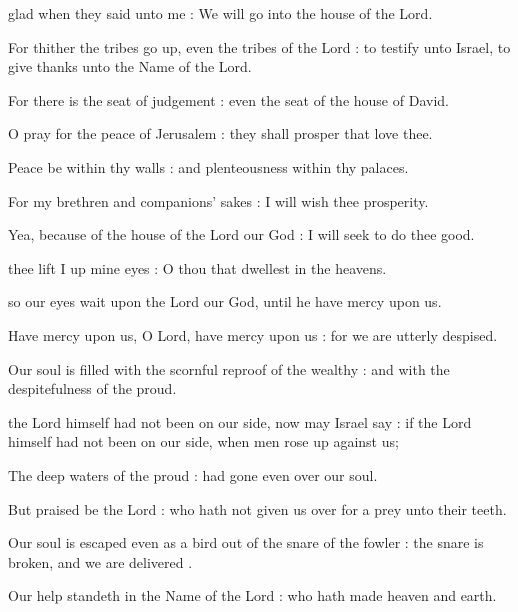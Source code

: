  glad when they said unto me : We will go into the house of the Lord.\par
{}
For thither the tribes go up, even the tribes of the Lord : to testify unto Israel, to give thanks unto the Name of the Lord.\par
{}For there is the seat of judgement : even the seat of the house of David.\par
{}O pray for the peace of Jerusalem : they shall prosper that love thee.\par
{}Peace be within thy walls : and plenteousness within thy palaces.\par
{}For my brethren and companions' sakes : I will wish thee prosperity.\par
{}Yea, because of the house of the Lord our God : I will seek to do thee good.\par


 thee lift I up mine eyes : O thou that dwellest in the heavens.\par
\noindent
so our eyes wait upon the Lord our God, until he have mercy upon us.\par
{}Have mercy upon us, O Lord, have mercy upon us : for we are utterly despised.\par
{}Our soul is filled with the scornful reproof of the wealthy : and with the despitefulness of the proud.\par


 the Lord himself had not been on our side, now may Israel say : if the Lord himself had not been on our side, when men rose up against us;\par
{}
The deep waters of the proud : had gone even over our soul.\par
{}But praised be the Lord : who hath not given us over for a prey unto their teeth.\par
{}Our soul is escaped even as a bird out of the snare of the fowler : the snare is broken, and we are delivered .\par
{}Our help standeth in the Name of the Lord : who hath made heaven and earth.\par

